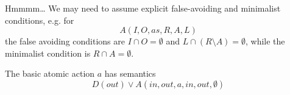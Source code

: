 Hmmmm\dots
We may need to assume explicit false-avoiding and minimalist conditions,
e.g. for
\[
   A(I,O,as,R,A,L)
\]
the false avoiding conditions are
$I \cap O = \emptyset$
and $L \cap (R \setminus A) = \emptyset$,
while the minimalist condition is $R \cap A = \emptyset$.

The basic atomic action $a$ has semantics
\[
  D(out) \lor A(in,out,a,in,out,\emptyset)
\]


































